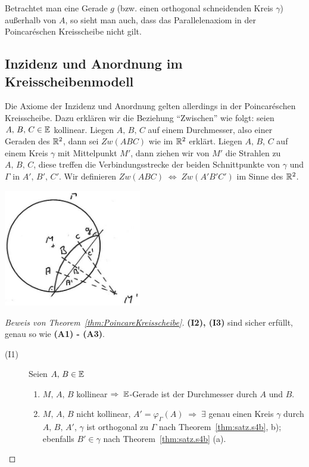 Betrachtet man eine Gerade $g$ (bzw. einen orthogonal schneidenden Kreis $\gamma$) außerhalb von
$A$, so sieht man auch, dass das Parallelenaxiom in der Poincaréschen Kreisscheibe nicht gilt.

\subsection*{Inzidenz und Anordnung im Kreisscheibenmodell}

Die Axiome der Inzidenz und Anordnung gelten allerdings in der Poincaréschen Kreisscheibe. Dazu
erklären wir die Beziehung "`Zwischen"' wie folgt: seien $A,\, B,\, C \in \mathbb E$ kollinear. Liegen
$A,\, B,\, C$ auf einem Durchmesser, also einer Geraden des $\mathbb R^2$, dann sei $Zw(ABC)$ wie im $\mathbb R^2$
erklärt. Liegen $A,\, B,\, C$ auf einem Kreis $\gamma$ mit Mittelpunkt $M'$, dann ziehen wir von
$M'$ die Strahlen zu $A,\, B,\, C$, diese treffen die Verbindungsstrecke der beiden Schnittpunkte
von $\gamma$ und $\Gamma$ in $A',\, B',\, C'$. Wir definieren $Zw(ABC)\; \Leftrightarrow\;
Zw(A'B'C')$ im Sinne des $\mathbb R^2$.

\centerline{\includegraphics[width=6cm]{BILDER/4-2-07-Zwischen.jpg}}

\begin{proof}[Beweis von Theorem~\ref{thm:PoincareKreisscheibe}]
    {\bf (I2), (I3)} sind sicher erfüllt, genau so wie {\bf (A1) - (A3)}. %
    \begin{description}
        \item[(I1)] Seien $A,\, B \in \mathbb E$
            \begin{enumerate}
                \item $M,\, A,\, B$ kollinear $\Rightarrow\; \mathbb E$-Gerade ist der Durchmesser durch
                    $A$ und $B$.

                \item $M,\, A,\, B$ nicht kollinear, $A' = \varphi_\Gamma(A)\; \Rightarrow\;
                    \exists$ genau einen Kreis $\gamma$ durch $A,\, B,\, A'$, $\gamma$ ist
                    orthogonal zu $\Gamma$ nach Theorem~\ref{thm:satz.s4b}, b); ebenfalls $B' \in
                    \gamma$ nach Theorem~\ref{thm:satz.s4b} (a).
            \end{enumerate}
    \end{description}
\end{proof}

